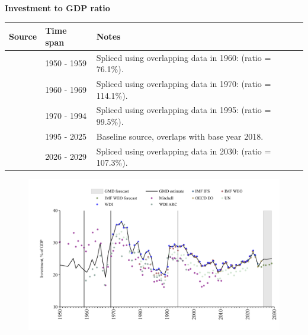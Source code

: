 \documentclass[12pt,a4paper,landscape]{article}
\begin{document}
\begin{adjustbox}{max totalsize={\paperwidth}{\paperheight},center}
\begin{minipage}[t][\textheight][t]{\textwidth}
\vspace*{0.5cm}
{}
\begin{center}
{\Large\bfseries Investment to GDP ratio}
\end{center}
\vspace{0.5cm}
\begin{table}[H]
\centering
\small
\begin{tabular}{|l|l|l|}
\hline
\textbf{Source} & \textbf{Time span} & \textbf{Notes} \\
\hline
\rowcolor{white}\cite{Mitchell}& 1950 - 1959 &Spliced using overlapping data in 1960: (ratio = 76.1\%). \\
\rowcolor{lightgray}\cite{WDI_ARC}& 1960 - 1969 &Spliced using overlapping data in 1970: (ratio = 114.1\%). \\
\rowcolor{white}\cite{WDI}& 1970 - 1994 &Spliced using overlapping data in 1995: (ratio = 99.5\%). \\
\rowcolor{lightgray}\cite{OECD_EO}& 1995 - 2025 &Baseline source, overlaps with base year 2018. \\
\rowcolor{white}\cite{IMF_WEO_forecast}& 2026 - 2029 &Spliced using overlapping data in 2030: (ratio = 107.3\%). \\
\hline
\end{tabular}
\end{table}
\begin{figure}[H]
\centering
\includegraphics[width=\textwidth,height=0.6\textheight,keepaspectratio]{graphs/ISR_inv_GDP.pdf}
\end{figure}
\end{minipage}
\end{adjustbox}
\end{document}

